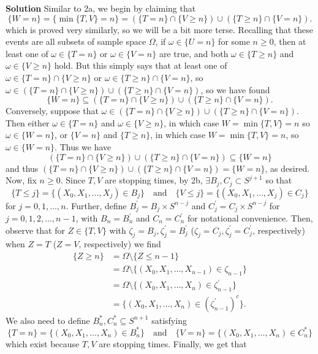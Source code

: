 \documentclass[11pt, letterpaper]{article}
\begin{document}
    {\bf Solution} Similar to 2a, we begin by claiming that
    \[\{W=n\}=\{\min\{T,V\}=n\}=\left(\{T=n\}\cap\{V\geq n\}\right)\cup\left(\{T\geq n\}\cap\{V=n\}\right).\]
    which is proved very similarly, so we will be a bit more terse. Recalling that these events are all subsets of sample space $\Omega$, if $\omega\in \{U=n\}$ for some $n\geq 0$, then at least one of $\omega\in\{T=n\}$ or $\omega\in\{V=n\}$ are true, and both $\omega\in\{T\geq n\}$ and $\omega\in\{V\geq n\}$ hold.
    But this simply says that at least one of $\omega\in\{T=n\}\cap\{V\geq n\}$ or $\omega\in\{T\geq n\}\cap\{V=n\}$, so $\omega\in(\{T=n\}\cap\{V\geq n\})\cup(\{T\geq n\}\cap\{V=n\})$, so we have found
    \[\{W=n\}\subseteq (\{T=n\}\cap\{V\geq n\})\cup(\{T\geq n\}\cap\{V=n\}).\]
    Conversely, suppose that $\omega\in(\{T=n\}\cap\{V\geq n\})\cup(\{T\geq n\}\cap\{V=n\})$. Then either $\omega\in\{T=n\}$ and $\omega\in\{V\geq n\}$, in which case $W=\min\{T,V\}=n$ so $\omega\in\{W=n\}$, or $\{V=n\}$ and $\{T\geq n\}$, in which case $W=\min\{T,V\}=n$, so $\omega\in\{W=n\}$. Thus we have
    \[(\{T=n\}\cap\{V\geq n\})\cup(\{T\geq n\}\cap\{V=n\})\subseteq\{W=n\}\]
    and thus $(\{T=n\}\cap\{V\geq n\})\cup(\{T\geq n\}\cap\{V=n\})=\{W=n\}$, as desired.\\[10pt]
    Now, fix $n\geq 0$. Since $T,V$ are stopping times, by 2b, $\exists B_j,C_j\subset S^{j+1}$ so that
    \[\{T\leq j\}=\{(X_0,X_1,\dots,X_j)\in B_j\}\quad\text{and}\quad\{V\leq j\}=\{(X_0,X_1,\dots,X_j)\in C_j\}\]
    for $j=0,1,\dots,n$. Further, define $B_j^\prime=B_j\times S^{n-j}$ and $C_j^\prime=C_j\times S^{n-j}$ for $j=0,1,2,\dots,n-1$, with $B_n=B_n^\prime$ and $C_n=C_n^\prime$ for notational convenience. Then, observe that for $Z\in\{T,V\}$ with $\zeta_j=B_j, \zeta_j^\prime=B_j^\prime$ ($\zeta_j=C_j,\zeta_j^\prime=C_j^\prime$, respectively) when $Z=T$ ($Z=V$, respectively)
    we find
    \begin{align*}
        \{Z\geq n\}&=\Omega\setminus\{Z\leq n-1\}\\
        &=\Omega\setminus\{(X_0,X_1,\dots,X_{n-1})\in \zeta_{n-1}\}\\
        &=\Omega\setminus\{(X_0,X_1,\dots,X_n)\in\zeta_{n-1}^\prime\}\\
        &=\{(X_0,X_1,\dots,X_n)\in(\zeta_{n-1}^\prime)^c\}.
    \end{align*}
    We also need to define $B_n^\ast,C_n^\ast\subseteq S^{n+1}$ satisfying
    \[\{T=n\}=\{(X_0,X_1,\dots,X_n)\in B_n^\ast\}\quad\text{and}\quad\{V=n\}=\{(X_0,X_1,\dots,X_n)\in C_n^\ast\}\]
    which exist because $T,V$ are stopping times. Finally, we get that
\end{document}
